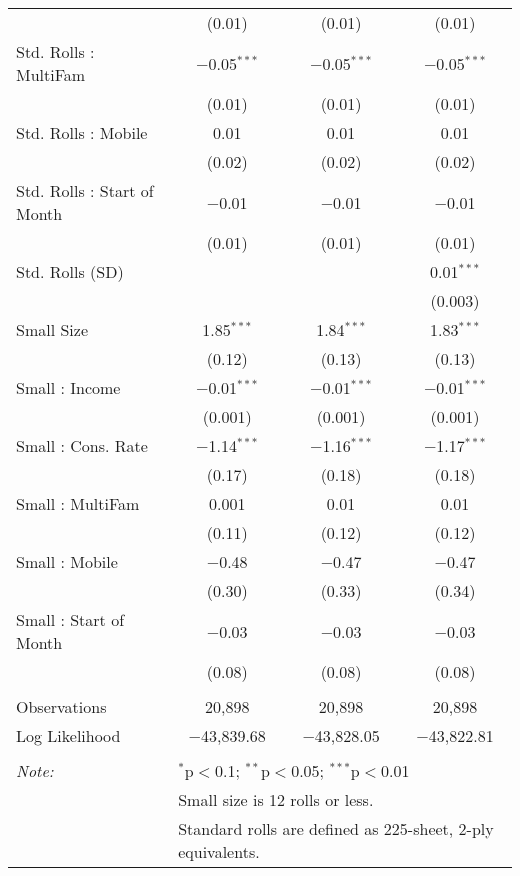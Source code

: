 \begin{table}[!htbp]
\begin{tabular}{@{\extracolsep{5pt}}lccc}
  & (0.01) & (0.01) & (0.01) \\ 
  Std. Rolls : MultiFam & $-$0.05$^{***}$ & $-$0.05$^{***}$ & $-$0.05$^{***}$ \\ 
  & (0.01) & (0.01) & (0.01) \\ 
  Std. Rolls : Mobile & 0.01 & 0.01 & 0.01 \\ 
  & (0.02) & (0.02) & (0.02) \\ 
  Std. Rolls : Start of Month & $-$0.01 & $-$0.01 & $-$0.01 \\ 
  & (0.01) & (0.01) & (0.01) \\ 
  Std. Rolls (SD) &  &  & 0.01$^{***}$ \\ 
  &  &  & (0.003) \\ 
  Small Size & 1.85$^{***}$ & 1.84$^{***}$ & 1.83$^{***}$ \\ 
  & (0.12) & (0.13) & (0.13) \\ 
  Small : Income & $-$0.01$^{***}$ & $-$0.01$^{***}$ & $-$0.01$^{***}$ \\ 
  & (0.001) & (0.001) & (0.001) \\ 
  Small : Cons. Rate & $-$1.14$^{***}$ & $-$1.16$^{***}$ & $-$1.17$^{***}$ \\ 
  & (0.17) & (0.18) & (0.18) \\ 
  Small : MultiFam & 0.001 & 0.01 & 0.01 \\ 
  & (0.11) & (0.12) & (0.12) \\ 
  Small : Mobile & $-$0.48 & $-$0.47 & $-$0.47 \\ 
  & (0.30) & (0.33) & (0.34) \\ 
  Small : Start of Month & $-$0.03 & $-$0.03 & $-$0.03 \\ 
  & (0.08) & (0.08) & (0.08) \\ 
 \hline \\[-1.8ex] 
Observations & 20,898 & 20,898 & 20,898 \\ 
Log Likelihood & $-$43,839.68 & $-$43,828.05 & $-$43,822.81 \\ 
\hline 
\hline \\[-1.8ex] 
\textit{Note:}  & \multicolumn{3}{l}{$^{*}$p$<$0.1; $^{**}$p$<$0.05; $^{***}$p$<$0.01} \\ 
 & \multicolumn{3}{l}{Small size is 12 rolls or less.} \\ 
 & \multicolumn{3}{l}{Standard rolls are defined as 225-sheet, 2-ply equivalents.} \\ 
\end{tabular} 
\end{table} 

